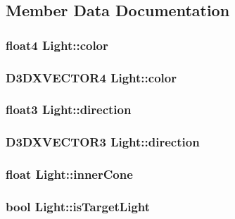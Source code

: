\subsection{Member Data Documentation}
\hypertarget{struct_light_afa605d539d182671f9627286569c130e}{
\subsubsection[{color}]{\setlength{\rightskip}{0pt plus 5cm}float4 {\bf Light::color}}}
\label{struct_light_afa605d539d182671f9627286569c130e}
\hypertarget{struct_light_a7022e45f9b09303c6ce2124f0c2eb581}{
\subsubsection[{color}]{\setlength{\rightskip}{0pt plus 5cm}D3DXVECTOR4 {\bf Light::color}}}
\label{struct_light_a7022e45f9b09303c6ce2124f0c2eb581}
\hypertarget{struct_light_a786f707f208776ebd9862518452f3a42}{
\subsubsection[{direction}]{\setlength{\rightskip}{0pt plus 5cm}float3 {\bf Light::direction}}}
\label{struct_light_a786f707f208776ebd9862518452f3a42}
\hypertarget{struct_light_a5069131d68d8930ad652b027c267f0a6}{
\subsubsection[{direction}]{\setlength{\rightskip}{0pt plus 5cm}D3DXVECTOR3 {\bf Light::direction}}}
\label{struct_light_a5069131d68d8930ad652b027c267f0a6}
\hypertarget{struct_light_ab1d047732c60a9833ee0b21c08234d0a}{
\subsubsection[{innerCone}]{\setlength{\rightskip}{0pt plus 5cm}float {\bf Light::innerCone}}}
\label{struct_light_ab1d047732c60a9833ee0b21c08234d0a}
\hypertarget{struct_light_a986bc50635faf4f74e51ebdb52354e30}{
\subsubsection[{isTargetLight}]{\setlength{\rightskip}{0pt plus 5cm}bool {\bf Light::isTargetLight}}}
